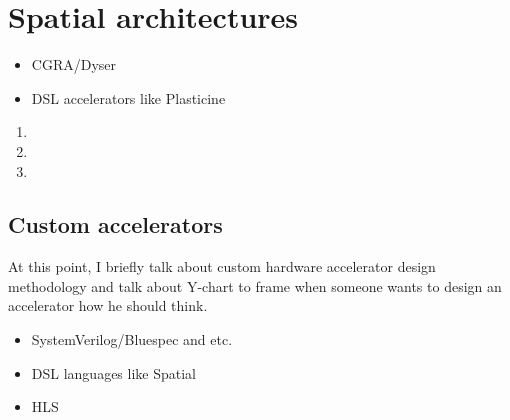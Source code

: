 


\section{Spatial architectures}

\begin{itemize}
    \item CGRA/Dyser
    \item DSL accelerators like Plasticine
\end{itemize}

\begin{enumerate}
    \item {}
    \item {}
    \item {}
\end{enumerate}


\subsection{Custom accelerators}

At this point, I briefly talk about custom hardware accelerator design methodology and talk about Y-chart to frame when someone wants to design an accelerator how he should think.
\begin{itemize}
    \item SystemVerilog/Bluespec and etc.
    \item DSL languages like Spatial
    \item HLS
\end{itemize}


